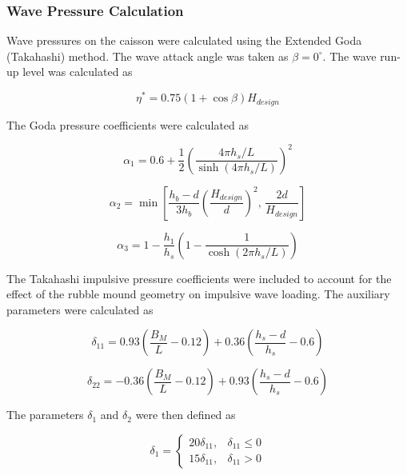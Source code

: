 \documentclass[a4paper, 11pt]{article}
\begin{document}
\subsubsection{Wave Pressure Calculation}

\hspace*{0.5cm} Wave pressures on the caisson were calculated using the Extended Goda (Takahashi) method. The wave attack angle was taken as \(\beta=0^\circ\). The wave run-up level was calculated as

\begin{equation}
    \eta^*=0.75(1+\cos\beta)H_{design}
\end{equation}

The Goda pressure coefficients were calculated as

\begin{equation}
    \alpha_1
    =
    0.6+
    \frac{1}{2}
    \left(
    \frac{4\pi h_s/L}{\sinh(4\pi h_s/L)}
    \right)^2
\end{equation}

\begin{equation}
    \alpha_2
    =
    \min\left[
    \frac{h_b-d}{3h_b}
    \left(\frac{H_{design}}{d}\right)^2,\,
    \frac{2d}{H_{design}}
    \right]
\end{equation}

\begin{equation}
    \alpha_3
    =
    1-
    \frac{h_1}{h_s}
    \left(
    1-\frac{1}{\cosh(2\pi h_s/L)}
    \right)
\end{equation}

The Takahashi impulsive pressure coefficients were included to account for the effect of the rubble mound geometry on impulsive wave loading. The auxiliary parameters were calculated as

\begin{equation}
    \delta_{11}
    =
    0.93\left(\frac{B_M}{L}-0.12\right)
    +
    0.36\left(\frac{h_s-d}{h_s}-0.6\right)
\end{equation}

\begin{equation}
    \delta_{22}
    =
    -0.36\left(\frac{B_M}{L}-0.12\right)
    +
    0.93\left(\frac{h_s-d}{h_s}-0.6\right)
\end{equation}

The parameters \(\delta_1\) and \(\delta_2\) were then defined as

\begin{equation}
    \delta_1=
    \begin{cases}
    20\delta_{11}, & \delta_{11}\leq0 \\
    15\delta_{11}, & \delta_{11}>0
    \end{cases}
\end{equation}
\end{document}
